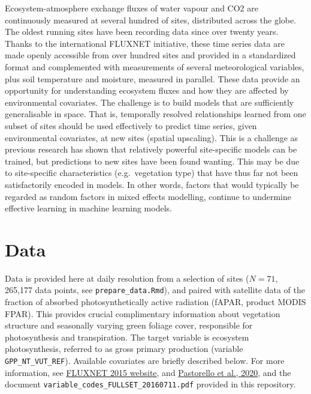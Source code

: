 \documentclass[
]{book}
\begin{document}
Ecosystem-atmosphere exchange fluxes of water vapour and CO2 are continuously measured at several hundred of sites, distributed across the globe. The oldest running sites have been recording data since over twenty years. Thanks to the international FLUXNET initiative, these time series data are made openly accessible from over hundred sites and provided in a standardized format and complemented with measurements of several meteorological variables, plus soil temperature and moisture, measured in parallel. These data provide an opportunity for understanding ecosystem fluxes and how they are affected by environmental covariates. The challenge is to build models that are sufficiently generalisable in space. That is, temporally resolved relationships learned from one subset of sites should be used effectively to predict time series, given environmental covariates, at new sites (spatial upscaling). This is a challenge as previous research has shown that relatively powerful site-specific models can be trained, but predictions to new sites have been found wanting. This may be due to site-specific characteristics (e.g.~vegetation type) that have thus far not been satisfactorily encoded in models. In other words, factors that would typically be regarded as random factors in mixed effects modelling, continue to undermine effective learning in machine learning models.

\hypertarget{data}{%
\section{Data}\label{data}}

Data is provided here at daily resolution from a selection of sites (\(N=71\), 265,177 data points, see \texttt{prepare\_data.Rmd}), and paired with satellite data of the fraction of absorbed photosynthetically active radiation (fAPAR, product MODIS FPAR). This provides crucial complimentary information about vegetation structure and seasonally varying green foliage cover, responsible for photosynthesis and transpiration. The target variable is ecosystem photosynthesis, referred to as gross primary production (variable \texttt{GPP\_NT\_VUT\_REF}). Available covariates are briefly described below. For more information, see \href{http://fluxnet.fluxdata.org/data/fluxnet2015-dataset/}{FLUXNET 2015 website}, and \href{https://www.nature.com/articles/s41597-020-0534-3}{Pastorello et al., 2020}, and the document \texttt{variable\_codes\_FULLSET\_20160711.pdf} provided in this repository.
\end{document}
